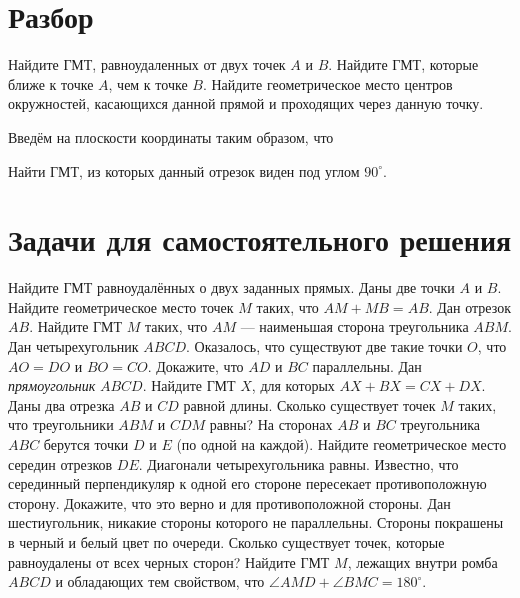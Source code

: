 \documentclass[a4paper,12pt]{article}
\begin{document}
    \iirules
    
    \section{Разбор}
    \problem \sub Найдите ГМТ, равноудаленных от двух точек $A$ и $B$. \sub Найдите ГМТ, которые ближе к точке $A$, чем к точке $B$.
    \problem Найдите геометрическое место центров окружностей, касающихся данной прямой и проходящих через данную точку.
    \begin{solution}
        Введём на плоскости координаты таким образом, что 
    \end{solution}
    \problem Найти ГМТ, из которых данный отрезок виден под углом $90^\circ$.
    
    \section{Задачи для самостоятельного решения}
    \problem Найдите ГМТ равноудалённых о двух заданных прямых.
    \problem Даны две точки $A$ и $B$. Найдите геометрическое место точек $M$ таких, что $AM + MB = AB$.
    \problem Дан отрезок $AB$. Найдите ГМТ $M$ таких, что $AM$ --- наименьшая сторона треугольника $ABM$.
    \problem Дан четырехугольник $ABCD$. Оказалось, что существуют две такие точки $O$, что $AO = DO$ и $BO = CO$. Докажите, что $AD$ и $BC$ параллельны.
    \problem Дан \textit{прямоугольник} $ABCD$. Найдите ГМТ $X$, для которых $AX + BX = CX + DX$.
    \problem Даны два отрезка $AB$ и $CD$ равной длины. Сколько существует точек $M$ таких, что треугольники $ABM$ и $CDM$ равны?
    \problem На сторонах $AB$ и $BC$ треугольника $ABC$ берутся точки $D$ и $E$ (по одной на каждой). Найдите геометрическое место середин отрезков $DE$.
     Диагонали четырехугольника равны. Известно, что серединный перпендикуляр к одной его стороне пересекает противоположную сторону. Докажите, что это верно и для противоположной стороны.
     Дан шестиугольник, никакие стороны которого не параллельны. Стороны покрашены в черный и белый цвет по очереди. Сколько существует точек, которые равноудалены от всех черных сторон?
     Найдите ГМТ $M$, лежащих внутри ромба $ABCD$ и обладающих тем свойством, что $\angle AMD + \angle BMC = 180^\circ$.
\end{document}

